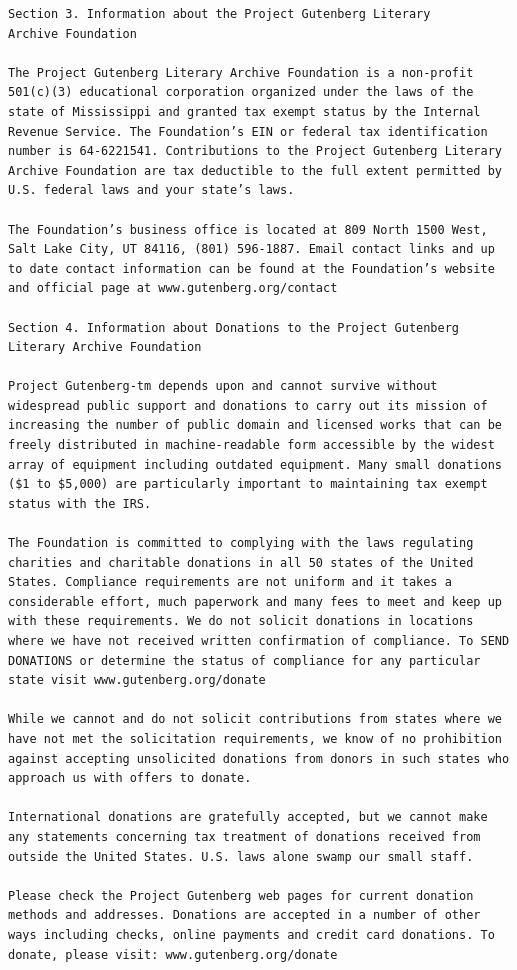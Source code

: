 \documentclass[11pt,oneside]{book}
\begin{document}
\begin{verbatim}
Section 3. Information about the Project Gutenberg Literary
Archive Foundation

The Project Gutenberg Literary Archive Foundation is a non-profit
501(c)(3) educational corporation organized under the laws of the
state of Mississippi and granted tax exempt status by the Internal
Revenue Service. The Foundation’s EIN or federal tax identification
number is 64-6221541. Contributions to the Project Gutenberg Literary
Archive Foundation are tax deductible to the full extent permitted by
U.S. federal laws and your state’s laws.

The Foundation’s business office is located at 809 North 1500 West,
Salt Lake City, UT 84116, (801) 596-1887. Email contact links and up
to date contact information can be found at the Foundation’s website
and official page at www.gutenberg.org/contact

Section 4. Information about Donations to the Project Gutenberg
Literary Archive Foundation

Project Gutenberg-tm depends upon and cannot survive without
widespread public support and donations to carry out its mission of
increasing the number of public domain and licensed works that can be
freely distributed in machine-readable form accessible by the widest
array of equipment including outdated equipment. Many small donations
($1 to $5,000) are particularly important to maintaining tax exempt
status with the IRS.

The Foundation is committed to complying with the laws regulating
charities and charitable donations in all 50 states of the United
States. Compliance requirements are not uniform and it takes a
considerable effort, much paperwork and many fees to meet and keep up
with these requirements. We do not solicit donations in locations
where we have not received written confirmation of compliance. To SEND
DONATIONS or determine the status of compliance for any particular
state visit www.gutenberg.org/donate

While we cannot and do not solicit contributions from states where we
have not met the solicitation requirements, we know of no prohibition
against accepting unsolicited donations from donors in such states who
approach us with offers to donate.

International donations are gratefully accepted, but we cannot make
any statements concerning tax treatment of donations received from
outside the United States. U.S. laws alone swamp our small staff.

Please check the Project Gutenberg web pages for current donation
methods and addresses. Donations are accepted in a number of other
ways including checks, online payments and credit card donations. To
donate, please visit: www.gutenberg.org/donate


\end{verbatim}
\end{document}
